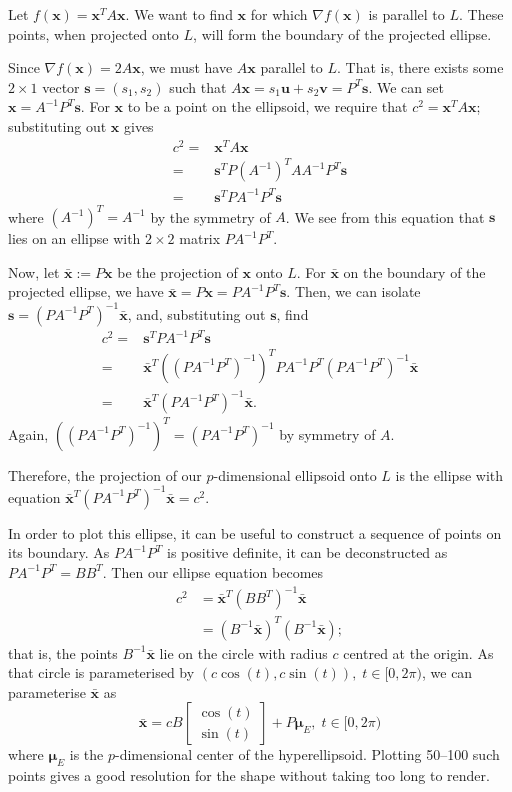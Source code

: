 \documentclass{article}
\renewcommand{\v}[1]{\boldsymbol{#1}}
\begin{document}
Let $f(\v{x}) = \v{x}^T A \v{x}$. We want to find $\v{x}$ for which $\nabla f (\v{x})$ is parallel to $L$. These points, when projected onto $L$, will form the boundary of the projected ellipse.

Since $\nabla f(\v{x}) = 2A\v{x}$, we must have $A\v{x}$ parallel to $L$. That is, there exists some $2 \times 1$ vector $\v{s} = (s_1, s_2)$ such that $A \v{x} = s_1\v{u} + s_2\v{v} = P^T \v{s}$. We can set $\v{x} = A^{-1}P^T\v{s}$. For $\v{x}$ to be a point on the ellipsoid, we require that $c^2 = \v{x}^T A \v{x}$; substituting out $\v{x}$ gives
\begin{align}
    c^2 =& \v{x}^T A \v{x}\\
    =& \v{s}^T P (A^{-1})^T A A^{-1} P^T \v{s}\\
    =& \v{s}^T P A^{-1} P^T \v{s}
\end{align}
where $(A^{-1})^T = A^{-1}$ by the symmetry of $A$. We see from this equation that $\v{s}$ lies on an ellipse with $2 \times 2$ matrix $P A^{-1} P^T$. 

Now, let $\bar{\v{x}} := P \v{x}$ be the projection of $\v{x}$ onto $L$. For $\bar{\v{x}}$ on the boundary of the projected ellipse, we have $\bar{\v{x}} = P \v{x} = P A^{-1} P^T \v{s}$. Then, we can isolate $\v{s} = (P A^{-1} P^T)^{-1} \bar{\v{x}}$, and, substituting out $\v{s}$, find
\begin{align}
    c^2 =& \v{s}^T P A^{-1} P^T \v{s}\\
    =& \bar{\v{x}}^T ((P A^{-1} P^T)^{-1})^T P A^{-1} P^T (P A^{-1} P^T)^{-1} \bar{\v{x}}\\
    =& \bar{\v{x}}^T (P A^{-1} P^T)^{-1} \bar{\v{x}}.
\end{align}
Again, $((P A^{-1} P^T)^{-1})^T = (P A^{-1} P^T)^{-1}$ by symmetry of $A$. 

Therefore, the projection of our $p$-dimensional ellipsoid onto $L$ is the ellipse with equation $\bar{\v{x}}^T (P A^{-1} P^T)^{-1} \bar{\v{x}} = c^2$.

In order to plot this ellipse, it can be useful to construct a sequence of points on its boundary. As $P A^{-1}P^T$ is positive definite, it can be deconstructed as $P A^{-1}P^T = B B^T$. Then our ellipse equation becomes
\begin{align*}
    c^2 &= \bar{\v{x}}^T (BB^T)^{-1} \bar{\v{x}}\\
    &= (B^{-1}\bar{\v{x}})^T (B^{-1}\bar{\v{x}});
\end{align*}
that is, the points $B^{-1}\bar{\v{x}}$ lie on the circle with radius $c$ centred at the origin. As that circle is parameterised by $(c\cos(t), c\sin(t)),\; t \in [0, 2\pi)$, we can parameterise $\bar{\v{x}}$ as
\begin{equation}
    \bar{\v{x}} = cB
    \begin{bmatrix}
        \cos(t)\\
        \sin(t)
    \end{bmatrix} + P\v{\mu}_E, \; t \in [0, 2\pi)
\end{equation}
where $\v{\mu}_E$ is the $p$-dimensional center of the hyperellipsoid. Plotting 50--100 such points gives a good resolution for the shape without taking too long to render.
\end{document}
